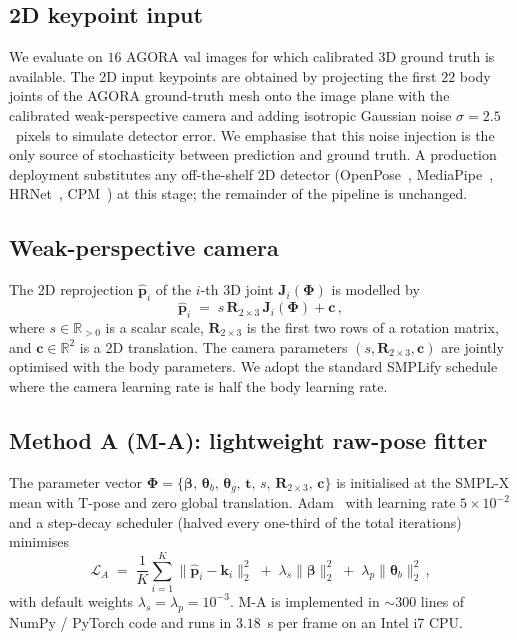 \documentclass[twocolumn,10pt]{svjour3}
\newcommand{\methodA}{\textsc{M-A}}
\begin{document}
\subsection{2D keypoint input}
We evaluate on $16$ AGORA val images for which calibrated 3D ground truth is available. The 2D input keypoints are obtained by projecting the first $22$ body joints of the AGORA ground-truth mesh onto the image plane with the calibrated weak-perspective camera and adding isotropic Gaussian noise $\sigma=2.5$~pixels to simulate detector error. We emphasise that this noise injection is the only source of stochasticity between prediction and ground truth. A production deployment substitutes any off-the-shelf 2D detector (OpenPose~\cite{OpenPose}, MediaPipe~\cite{Mediapipe}, HRNet~\cite{HRNet}, CPM~\cite{CPM}) at this stage; the remainder of the pipeline is unchanged.

\subsection{Weak-perspective camera}
The 2D reprojection $\hat{\mathbf{p}}_i$ of the $i$-th 3D joint $\mathbf{J}_i(\boldsymbol{\Phi})$ is modelled by
\begin{equation}
\hat{\mathbf{p}}_i \;=\; s\,\mathbf{R}_{2\times 3}\,\mathbf{J}_i(\boldsymbol{\Phi}) + \mathbf{c}\,,
\label{eq:weakpersp}
\end{equation}
where $s\!\in\!\mathbb{R}_{>0}$ is a scalar scale, $\mathbf{R}_{2\times 3}$ is the first two rows of a rotation matrix, and $\mathbf{c}\!\in\!\mathbb{R}^2$ is a 2D translation. The camera parameters $(s,\mathbf{R}_{2\times 3},\mathbf{c})$ are jointly optimised with the body parameters. We adopt the standard SMPLify schedule where the camera learning rate is half the body learning rate.

\subsection{Method A (\methodA{}): lightweight raw-pose fitter}
The parameter vector $\boldsymbol{\Phi} = \{\boldsymbol{\beta},\,\boldsymbol{\theta}_b,\,\boldsymbol{\theta}_g,\,\mathbf{t},\,s,\,\mathbf{R}_{2\times 3},\,\mathbf{c}\}$ is initialised at the SMPL-X mean with T-pose and zero global translation. Adam~\cite{Adam} with learning rate $5\!\times\!10^{-2}$ and a step-decay scheduler (halved every one-third of the total iterations) minimises
\begin{equation}
\mathcal{L}_A \;=\; \frac{1}{K}\sum_{i=1}^{K}\|\hat{\mathbf{p}}_i - \mathbf{k}_i\|_2^2 \;+\; \lambda_s\|\boldsymbol{\beta}\|_2^2 \;+\; \lambda_p\|\boldsymbol{\theta}_b\|_2^2\,,
\label{eq:La}
\end{equation}
with default weights $\lambda_s=\lambda_p=10^{-3}$. \methodA{} is implemented in $\sim$300 lines of NumPy / PyTorch code and runs in $3.18$~s per frame on an Intel i7 CPU.
\end{document}
